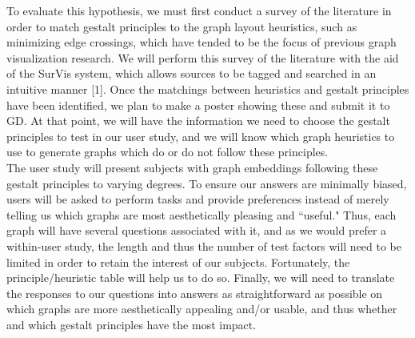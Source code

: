 \documentclass[12pt, twocolumn]{article}
\begin{document}
To evaluate this hypothesis, we must first conduct a survey of the literature in order to match gestalt principles to the graph layout heuristics, such as minimizing edge crossings, which have tended to be the focus of previous graph visualization research. 
We will perform this survey of the literature with the aid of the SurVis system, which allows sources to be tagged and searched in an intuitive manner [1].
Once the matchings between heuristics and gestalt principles have been identified, we plan to make a poster showing these and submit it to GD. 
At that point, we will have the information we need to choose the gestalt principles to test in our user study, and we will know which graph heuristics to use to generate graphs which do or do not follow these principles.
\\


The user study will present subjects with graph embeddings following these  gestalt principles to varying degrees.
To ensure our answers are minimally biased, users will be asked to perform tasks and provide preferences instead of merely telling us which graphs are most aesthetically pleasing and ``useful."
Thus, each graph will have several questions associated with it, and as we would prefer a within-user 
study, the length and thus the number of test factors will need to be limited in order to retain the interest of our subjects. 
Fortunately, the principle/heuristic table will help us to do so.
Finally, we will need to translate the responses to our questions into answers as straightforward as possible on which graphs are more aesthetically appealing and/or usable, and thus whether and which gestalt principles have the most impact. 
\end{document}
